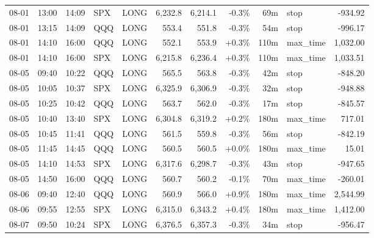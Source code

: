 \documentclass[11pt,a4paper,twoside]{article}
\begin{document}
\begin{center}
\begin{longtable}{>{\color{txtmain}}l l l l l r r r r >{\color{txtmain}}l r}
08-01 & 13:00 & 14:09 & SPX & LONG & 6,232.8 & 6,214.1 & \textcolor{lossred}{-0.3\%} & 69m & stop & \textcolor{lossred}{-934.92} \\
08-01 & 13:15 & 14:09 & QQQ & LONG & 553.4 & 551.8 & \textcolor{lossred}{-0.3\%} & 54m & stop & \textcolor{lossred}{-996.17} \\
08-01 & 14:10 & 16:00 & QQQ & LONG & 552.1 & 553.9 & \textcolor{wingreen}{+0.3\%} & 110m & max\_time & \textcolor{wingreen}{1,032.00} \\
08-01 & 14:10 & 16:00 & SPX & LONG & 6,215.8 & 6,236.4 & \textcolor{wingreen}{+0.3\%} & 110m & max\_time & \textcolor{wingreen}{1,033.51} \\
08-05 & 09:40 & 10:22 & QQQ & LONG & 565.5 & 563.8 & \textcolor{lossred}{-0.3\%} & 42m & stop & \textcolor{lossred}{-848.20} \\
08-05 & 10:05 & 10:37 & SPX & LONG & 6,325.9 & 6,306.9 & \textcolor{lossred}{-0.3\%} & 32m & stop & \textcolor{lossred}{-948.88} \\
08-05 & 10:25 & 10:42 & QQQ & LONG & 563.7 & 562.0 & \textcolor{lossred}{-0.3\%} & 17m & stop & \textcolor{lossred}{-845.57} \\
08-05 & 10:40 & 13:40 & SPX & LONG & 6,304.8 & 6,319.2 & \textcolor{wingreen}{+0.2\%} & 180m & max\_time & \textcolor{wingreen}{717.01} \\
08-05 & 10:45 & 11:41 & QQQ & LONG & 561.5 & 559.8 & \textcolor{lossred}{-0.3\%} & 56m & stop & \textcolor{lossred}{-842.19} \\
08-05 & 11:45 & 14:45 & QQQ & LONG & 560.5 & 560.5 & \textcolor{wingreen}{+0.0\%} & 180m & max\_time & \textcolor{wingreen}{15.01} \\
08-05 & 14:10 & 14:53 & SPX & LONG & 6,317.6 & 6,298.7 & \textcolor{lossred}{-0.3\%} & 43m & stop & \textcolor{lossred}{-947.65} \\
08-05 & 14:50 & 16:00 & QQQ & LONG & 560.7 & 560.2 & \textcolor{lossred}{-0.1\%} & 70m & max\_time & \textcolor{lossred}{-260.01} \\
08-06 & 09:40 & 12:40 & QQQ & LONG & 560.9 & 566.0 & \textcolor{wingreen}{+0.9\%} & 180m & max\_time & \textcolor{wingreen}{2,544.99} \\
08-06 & 09:55 & 12:55 & SPX & LONG & 6,315.0 & 6,343.2 & \textcolor{wingreen}{+0.4\%} & 180m & max\_time & \textcolor{wingreen}{1,412.00} \\
08-07 & 09:50 & 10:24 & SPX & LONG & 6,376.5 & 6,357.3 & \textcolor{lossred}{-0.3\%} & 34m & stop & \textcolor{lossred}{-956.47} \\

\end{longtable}
\end{center}
\end{document}

